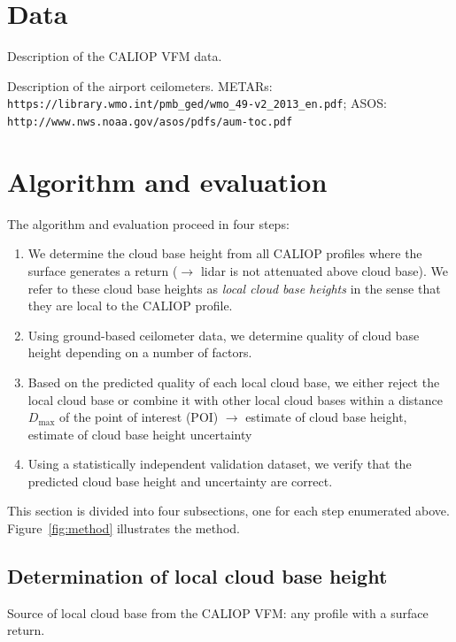 \documentclass[amt,manuscript]{copernicus}\usepackage[]{graphicx}\usepackage[]{color}
\begin{document}
\section{Data}
\label{sec:data}

Description of the CALIOP VFM data.

Description of the airport ceilometers.  METARs:
\verb+https://library.wmo.int/pmb_ged/wmo_49-v2_2013_en.pdf+; ASOS:
\verb+http://www.nws.noaa.gov/asos/pdfs/aum-toc.pdf+ 

\section{Algorithm and evaluation}
\label{sec:algorithm}

The algorithm and evaluation proceed in four steps:
\begin{enumerate}
\item We determine the cloud base height from all CALIOP profiles where the
  surface generates a return ($\longrightarrow$ lidar is not attenuated above
  cloud base).  We refer to these cloud base heights as \textit{local cloud base
    heights} in the sense that they are local to the CALIOP profile.
\item Using ground-based ceilometer data, we determine quality of cloud base
  height depending on a number of factors.  
\item Based on the predicted quality of each local cloud base, we either reject
  the local cloud base or combine it with other local cloud bases within a
  distance $D_\text{max}$ of the point of interest (POI) $\longrightarrow$ estimate of cloud base
  height, estimate of cloud base height uncertainty
\item Using a statistically independent validation dataset, we verify that the
  predicted cloud base height and uncertainty are correct.
\end{enumerate}

This section is divided into four subsections, one for each step enumerated
above.  Figure~\ref{fig:method} illustrates the method.

\subsection{Determination of local cloud base height}
\label{sec:algorithm:local}
Source of local cloud base from the CALIOP VFM: any profile with a surface
return.  
\end{document}
